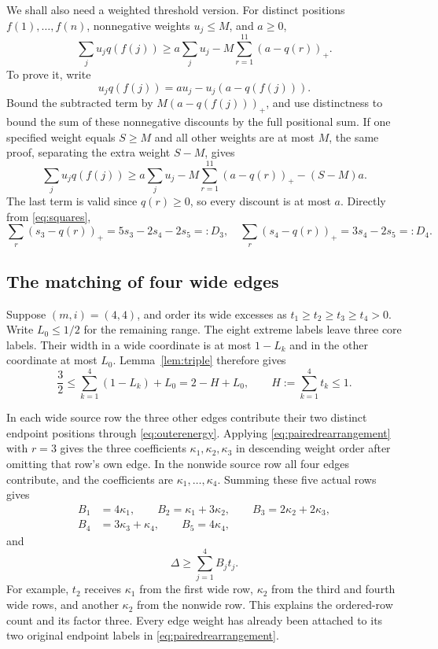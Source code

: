 \documentclass[11pt]{article}
\theoremstyle{definition}
\theoremstyle{remark}
\newcommand{\pos}[1]{\left(#1\right)_+}
\begin{document}
We shall also need a weighted threshold version. For distinct positions
$f(1),\ldots,f(n)$, nonnegative weights $u_j\leq M$, and $a\geq0$,
\begin{equation}\label{eq:threshold}
 \sum_ju_jq(f(j))\geq
 a\sum_ju_j-M\sum_{r=1}^{11}\pos{a-q(r)}.
\end{equation}
To prove it, write
\[
 u_jq(f(j))=au_j-u_j(a-q(f(j))).
\]
Bound the subtracted term by $M\pos{a-q(f(j))}$, and use distinctness
to bound the sum of these nonnegative discounts by the full positional
sum. If one specified weight equals $S\geq M$ and all other weights are
at most $M$, the same proof, separating the extra weight $S-M$, gives
\begin{equation}\label{eq:onelarge}
 \sum_ju_jq(f(j))\geq
 a\sum_ju_j-M\sum_{r=1}^{11}\pos{a-q(r)}-(S-M)a.
\end{equation}
The last term is valid since $q(r)\geq0$, so every discount is at most
$a$. Directly from \eqref{eq:squares},
\begin{equation}\label{eq:discounts}
 \sum_r\pos{s_3-q(r)}=5s_3-2s_4-2s_5=:D_3,
 \quad
 \sum_r\pos{s_4-q(r)}=3s_4-2s_5=:D_4.
\end{equation}

\subsection{The matching of four wide edges}\label{subsec:fourmatching}

Suppose $(m,i)=(4,4)$, and order its wide excesses as
$t_1\geq t_2\geq t_3\geq t_4>0$. Write $L_0\leq1/2$ for the
remaining range. The eight extreme labels leave three core labels.
Their width in a wide coordinate is at most $1-L_k$ and in the other
coordinate at most $L_0$. Lemma~\ref{lem:triple} therefore gives
\[
 \frac32\leq\sum_{k=1}^4(1-L_k)+L_0
      =2-H+L_0,
 \qquad H:=\sum_{k=1}^4t_k\leq1.
\]

In each wide source row the three other edges contribute their two
distinct endpoint positions through \eqref{eq:outerenergy}. Applying
\eqref{eq:pairedrearrangement} with $r=3$ gives the three coefficients
$\kappa_1,\kappa_2,\kappa_3$ in descending weight order after omitting
that row's own edge. In the nonwide source row all four edges contribute,
and the coefficients are $\kappa_1,\ldots,\kappa_4$. Summing these
five actual rows gives
\begin{equation}\label{eq:Bdefinitions}
 \begin{split}
 B_1&=4\kappa_1,\qquad B_2=\kappa_1+3\kappa_2,\qquad
 B_3=2\kappa_2+2\kappa_3,\\
 B_4&=3\kappa_3+\kappa_4,\qquad B_5=4\kappa_4,
 \end{split}
\end{equation}
and
\begin{equation}\label{eq:fourmatchinglower}
 \Delta\geq\sum_{j=1}^4B_jt_j.
\end{equation}
For example, $t_2$ receives $\kappa_1$ from the first wide row,
$\kappa_2$ from the third and fourth wide rows, and another $\kappa_2$
from the nonwide row. This explains the ordered-row count and its factor
three. Every edge weight has already been attached to its two original
endpoint labels in \eqref{eq:pairedrearrangement}.
\end{document}
